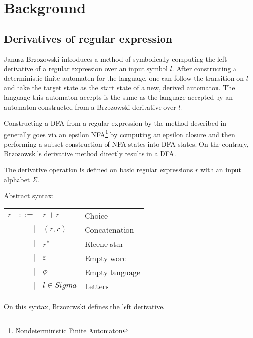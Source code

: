 \chapter{Background}
\label{background}

\section{Derivatives of regular expression}

Janusz Brzozowski introduces a method of symbolically computing the left
derivative of a regular expression over an input symbol $l$. After constructing
a deterministic finite automaton for the language, one can follow the transition
on $l$ and take the target state as the start state of a new, derived automaton.
The language this automaton accepts is the same as the language accepted by an
automaton constructed from a Brzozowski derivative over $l$.

Constructing a DFA from a regular expression by the method described in
\cite{thompson} generally goes via an epsilon NFA\footnote{Nondeterministic
Finite Automaton} by computing an epsilon closure and then performing a subset
construction of NFA states into DFA states. On the contrary, Brzozowski's
derivative method directly results in a DFA.

The derivative operation is defined on basic regular expressions $r$ with an
input alphabet $\Sigma$.

\begin{defn}
   \label{defn-bre}
   Abstract syntax:

   \begin{tabular}{lrll}
      $r$	& $::=$	& $r+r$				& Choice		\\
		& $|$	& $(r,r)$			& Concatenation		\\
		& $|$	& $r^*$				& Kleene star		\\
		& $|$	& $\varepsilon$			& Empty word		\\
		& $|$	& $\phi$			& Empty language	\\
		& $|$	& $l \in Sigma$			& Letters		\\
   \end{tabular}
\end{defn}

On this syntax, Brzozowski defines the left derivative.

